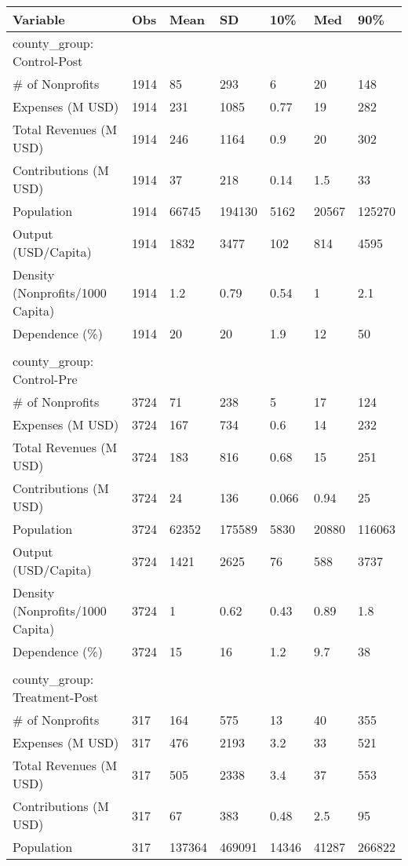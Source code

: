 
\begin{tabular}{lllllll}
\toprule
Variable & Obs & Mean & SD & 10\% & Med & 90\%\\
\midrule
county_group: Control-Post &  &  &  &  &  & \\
\# of Nonprofits & 1914 & 85 & 293 & 6 & 20 & 148\\
Expenses (M USD) & 1914 & 231 & 1085 & 0.77 & 19 & 282\\
Total Revenues (M USD) & 1914 & 246 & 1164 & 0.9 & 20 & 302\\
Contributions (M USD) & 1914 & 37 & 218 & 0.14 & 1.5 & 33\\
Population & 1914 & 66745 & 194130 & 5162 & 20567 & 125270\\
Output (USD/Capita) & 1914 & 1832 & 3477 & 102 & 814 & 4595\\
Density (Nonprofits/1000 Capita) & 1914 & 1.2 & 0.79 & 0.54 & 1 & 2.1\\
Dependence (\%) & 1914 & 20 & 20 & 1.9 & 12 & 50\\
 &  &  &  &  &  & \\
county_group: Control-Pre &  &  &  &  &  & \\
\# of Nonprofits & 3724 & 71 & 238 & 5 & 17 & 124\\
Expenses (M USD) & 3724 & 167 & 734 & 0.6 & 14 & 232\\
Total Revenues (M USD) & 3724 & 183 & 816 & 0.68 & 15 & 251\\
Contributions (M USD) & 3724 & 24 & 136 & 0.066 & 0.94 & 25\\
Population & 3724 & 62352 & 175589 & 5830 & 20880 & 116063\\
Output (USD/Capita) & 3724 & 1421 & 2625 & 76 & 588 & 3737\\
Density (Nonprofits/1000 Capita) & 3724 & 1 & 0.62 & 0.43 & 0.89 & 1.8\\
Dependence (\%) & 3724 & 15 & 16 & 1.2 & 9.7 & 38\\
 &  &  &  &  &  & \\
county_group: Treatment-Post &  &  &  &  &  & \\
\# of Nonprofits & 317 & 164 & 575 & 13 & 40 & 355\\
Expenses (M USD) & 317 & 476 & 2193 & 3.2 & 33 & 521\\
Total Revenues (M USD) & 317 & 505 & 2338 & 3.4 & 37 & 553\\
Contributions (M USD) & 317 & 67 & 383 & 0.48 & 2.5 & 95\\
Population & 317 & 137364 & 469091 & 14346 & 41287 & 266822\\

\end{tabular}
